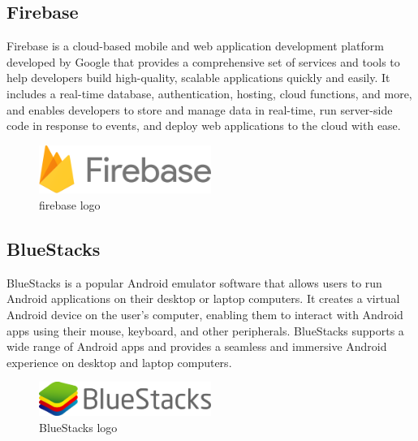 \subsection{Firebase}
Firebase is a cloud-based mobile and web application development platform developed by Google that provides a comprehensive set of services and tools to help developers build high-quality, scalable applications quickly and easily. It includes a real-time database, authentication, hosting, cloud functions, and more, and enables developers to store and manage data in real-time, run server-side code in response to events, and deploy web applications to the cloud with ease.\cite{firebase}
\begin{figure}[H]
    \centering
    \includegraphics[width=0.5\textwidth]{images/512px-Firebase_Logo.svg.png}
    \caption{firebase logo}
    \label{fig:figure4}
\end{figure}

\subsection{BlueStacks}
BlueStacks is a popular Android emulator software that allows users to run Android applications on their desktop or laptop computers. It creates a virtual Android device on the user's computer, enabling them to interact with Android apps using their mouse, keyboard, and other peripherals. BlueStacks supports a wide range of Android apps and provides a seamless and immersive Android experience on desktop and laptop computers.\cite{bluestacks}
\begin{figure}[h]
    \centering
    \includegraphics[width=0.5\textwidth]{images/e634679eb4e06627c42ca5667d83e88e.png}
    \caption{BlueStacks logo}
    \label{fig:figure4}
\end{figure}

